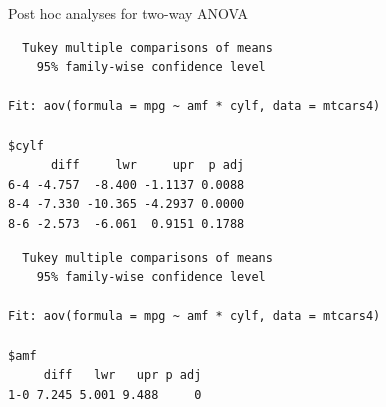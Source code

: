 \begin{frame}[fragile]{Post hoc analyses for two-way ANOVA}

\begin{Shaded}
\begin{Highlighting}[]
\NormalTok{)}
\end{Highlighting}
\end{Shaded}

\begin{verbatim}
  Tukey multiple comparisons of means
    95% family-wise confidence level

Fit: aov(formula = mpg ~ amf * cylf, data = mtcars4)

$cylf
      diff     lwr     upr  p adj
6-4 -4.757  -8.400 -1.1137 0.0088
8-4 -7.330 -10.365 -4.2937 0.0000
8-6 -2.573  -6.061  0.9151 0.1788
\end{verbatim}

\begin{Shaded}
\begin{Highlighting}[]
\NormalTok{)}
\end{Highlighting}
\end{Shaded}

\begin{verbatim}
  Tukey multiple comparisons of means
    95% family-wise confidence level

Fit: aov(formula = mpg ~ amf * cylf, data = mtcars4)

$amf
     diff   lwr   upr p adj
1-0 7.245 5.001 9.488     0
\end{verbatim}

\end{frame}

